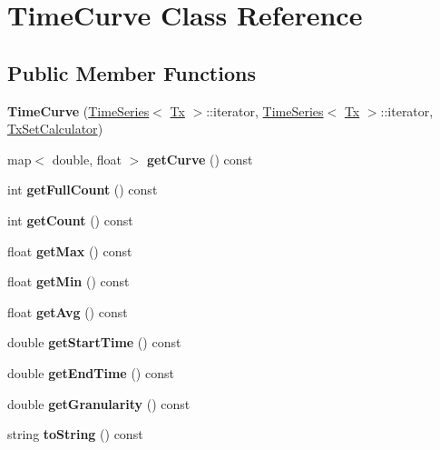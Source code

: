 \hypertarget{class_time_curve}{}\section{Time\+Curve Class Reference}
\label{class_time_curve}
\subsection*{Public Member Functions}
\begin{DoxyCompactItemize}
\item 
\mbox{\label{class_time_curve_ac14b01b5912e595a5eabf7e18037182c}} 
{\bfseries Time\+Curve} (\mbox{\hyperlink{class_time_series}{Time\+Series}}$<$ \mbox{\hyperlink{struct_tx}{Tx}} $>$\+::iterator, \mbox{\hyperlink{class_time_series}{Time\+Series}}$<$ \mbox{\hyperlink{struct_tx}{Tx}} $>$\+::iterator, \mbox{\hyperlink{class_tx_set_calculator}{Tx\+Set\+Calculator}})
\item 
\mbox{\label{class_time_curve_ae89faf04ad2058d22ab6bbda368db6ae}} 
map$<$ double, float $>$ {\bfseries get\+Curve} () const
\item 
\mbox{\label{class_time_curve_a66215ed449760eec02fc4e5935ead88d}} 
int {\bfseries get\+Full\+Count} () const
\item 
\mbox{\label{class_time_curve_a125d2f564e6aef2b6fea42dab2d631aa}} 
int {\bfseries get\+Count} () const
\item 
\mbox{\label{class_time_curve_a604f3be1ca972bc24d6e2b094a6da4e9}} 
float {\bfseries get\+Max} () const
\item 
\mbox{\label{class_time_curve_a28a1ea7f6f36fe41e6a59f21f022bcb9}} 
float {\bfseries get\+Min} () const
\item 
\mbox{\label{class_time_curve_a928370cfcc4300cee821c5b130777a6c}} 
float {\bfseries get\+Avg} () const
\item 
\mbox{\label{class_time_curve_af7e1addb63dd5c03f7b0e05474eb5192}} 
double {\bfseries get\+Start\+Time} () const
\item 
\mbox{\label{class_time_curve_a19d11b7c6a01378ef3dc0f9449d56711}} 
double {\bfseries get\+End\+Time} () const
\item 
\mbox{\label{class_time_curve_a3efa560bca5bc8db08cd66901a5763cf}} 
double {\bfseries get\+Granularity} () const
\item 
\mbox{\label{class_time_curve_afc64b4ed364377de075eee475dc41150}} 
string {\bfseries to\+String} () const
\end{DoxyCompactItemize}


